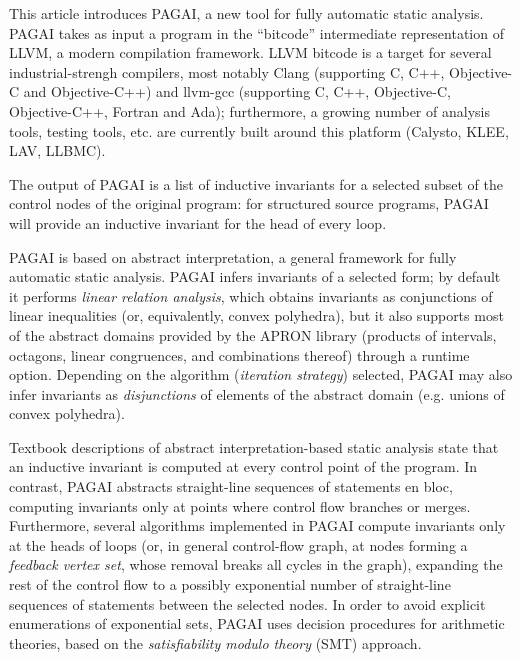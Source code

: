 \documentclass{entcs}
\begin{document}
This article introduces PAGAI, a new tool for fully automatic static analysis.
PAGAI takes as input a program in the ``bitcode'' intermediate representation of LLVM\citep{LLVM_langref,Lattner:2004:LCF:977395.977673}, a modern compilation framework.
LLVM bitcode is a target for several industrial-strengh compilers, most notably Clang (supporting C, C++, Objective-C and Objective-C++) and llvm-gcc (supporting C, C++, Objective-C, Objective-C++, Fortran and Ada);
furthermore, a growing number of analysis tools, testing tools, etc. are currently built around this platform (Calysto, KLEE, LAV, LLBMC).

The output of PAGAI is a list of inductive invariants for a selected subset of the control nodes of the original program:
for structured source programs, PAGAI will provide an inductive invariant for the head of every loop.

PAGAI is based on abstract interpretation, a general framework for fully automatic static analysis.
PAGAI infers invariants of a selected form; by default it performs \emph{linear relation analysis}, which obtains invariants as conjunctions of linear inequalities (or, equivalently, convex polyhedra), but it also supports most of the abstract domains provided by the APRON library (products of intervals, octagons, linear congruences, and combinations thereof) through a runtime option.
Depending on the algorithm (\emph{iteration strategy}) selected, PAGAI may also infer invariants as \emph{disjunctions} of elements of the abstract domain (e.g. unions of convex polyhedra).

Textbook descriptions of abstract interpretation-based static analysis state that an inductive invariant is computed at every control point of the program.
In contrast, PAGAI abstracts straight-line sequences of statements en bloc, computing invariants only at points where control flow branches or merges.
Furthermore, several algorithms implemented in PAGAI compute invariants only at the heads of loops (or, in general control-flow graph, at nodes forming a \emph{feedback vertex set}, whose removal breaks all cycles in the graph), expanding the rest of the control flow to a possibly exponential number of straight-line sequences of statements between the selected nodes.
In order to avoid explicit enumerations of exponential sets, PAGAI uses decision procedures for arithmetic theories, based on the \emph{satisfiability modulo theory} (SMT) approach.

\end{document}

